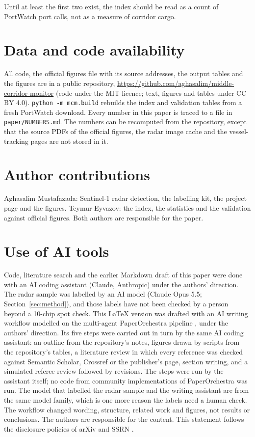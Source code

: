 \documentclass[11pt,a4paper]{article}
\begin{document}
Until at least the first two exist, the index should be read as a count of PortWatch port calls, not as a measure of corridor cargo.

\section*{Data and code availability}

All code, the official figures file with its source addresses, the output tables and the figures are in a public repository, \url{https://github.com/aghasalim/middle-corridor-monitor} (code under the MIT licence; text, figures and tables under CC BY 4.0). \texttt{python -m mcm.build} rebuilds the index and validation tables from a fresh PortWatch download. Every number in this paper is traced to a file in \texttt{paper/NUMBERS.md}. The numbers can be recomputed from the repository, except that the source PDFs of the official figures, the radar image cache and the vessel-tracking pages are not stored in it.

\section*{Author contributions}

Aghasalim Mustafazada: Sentinel-1 radar detection, the labelling kit, the project page and the figures. Teymur Eyvazov: the index, the statistics and the validation against official figures. Both authors are responsible for the paper.

\section*{Use of AI tools}

Code, literature search and the earlier Markdown draft of this paper were done with an AI coding assistant (Claude, Anthropic) under the authors' direction. The radar sample was labelled by an AI model (Claude Opus 5.5; Section~\ref{sec:method}), and those labels have not been checked by a person beyond a 10-chip spot check. This LaTeX version was drafted with an AI writing workflow modelled on the multi-agent PaperOrchestra pipeline \cite{song2026paperorchestra}, under the authors' direction. Its five steps were carried out in turn by the same AI coding assistant: an outline from the repository's notes, figures drawn by scripts from the repository's tables, a literature review in which every reference was checked against Semantic Scholar, Crossref or the publisher's page, section writing, and a simulated referee review followed by revisions. The steps were run by the assistant itself; no code from community implementations of PaperOrchestra was run. The model that labelled the radar sample and the writing assistant are from the same model family, which is one more reason the labels need a human check. The workflow changed wording, structure, related work and figures, not results or conclusions. The authors are responsible for the content. This statement follows the disclosure policies of arXiv and SSRN \cite{arxiv2023genai,ssrn2026genai}.

\small


\end{document}
